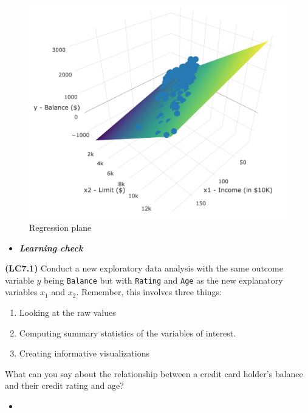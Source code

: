 \documentclass[12pt,]{krantz}
\providecommand{\tightlist}{%
  \setlength{\itemsep}{0pt}\setlength{\parskip}{0pt}}
\newenvironment{rmdblock}[1]
  {\begin{shaded*}
  \begin{itemize}
  \renewcommand{\labelitemi}{
    \raisebox{-.7\height}[0pt][0pt]{
    }
  }
  \item
  }
  {
  \end{itemize}
  \end{shaded*}
  }
\newenvironment{learncheck}
  {\begin{rmdblock}{warning}}
  {\end{rmdblock}}
\theoremstyle{definition}
\theoremstyle{definition}
\theoremstyle{definition}
\theoremstyle{remark}
\begin{document}
\begin{figure}

{\centering \includegraphics[width=\textwidth]{images/credit_card_balance_regression_plane} 

}

\caption{Regression plane}\label{fig:unnamed-chunk-232}
\end{figure}

\begin{learncheck}
\textbf{\emph{Learning check}}
\end{learncheck}

\textbf{(LC7.1)} Conduct a new exploratory data analysis with the same
outcome variable \(y\) being \texttt{Balance} but with \texttt{Rating}
and \texttt{Age} as the new explanatory variables \(x_1\) and \(x_2\).
Remember, this involves three things:

\begin{enumerate}
\def\labelenumi{\alph{enumi})}
\tightlist
\item
  Looking at the raw values
\item
  Computing summary statistics of the variables of interest.
\item
  Creating informative visualizations
\end{enumerate}

What can you say about the relationship between a credit card holder's
balance and their credit rating and age?

\begin{learncheck}

\end{learncheck}
\end{document}
